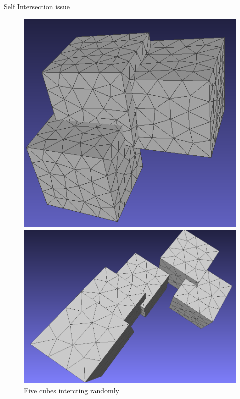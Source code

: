 \documentclass[10pt]{beamer}
\begin{document}
\begin{frame}{Self Intersection issue}
\begin{figure}
\begin{minipage}[b]{0.23\textwidth}
          \caption{Two cubes intersecting a third one}
        \end{minipage}\hfill
        \begin{minipage}[b]{0.23\textwidth}
          \centering
          \includegraphics[width=\textwidth]{../image/3cubes_tresproche.png}
          \caption{Three cubes self intersecting}
        \end{minipage}\hfill
        \begin{minipage}[b]{0.23\textwidth}
          \centering
          \includegraphics[width=\textwidth]{../image/5cubes.png}
          \caption{Five cubes  intercting randomly}
        \end{minipage}
      \end{figure}    
\end{frame}
\end{document}

